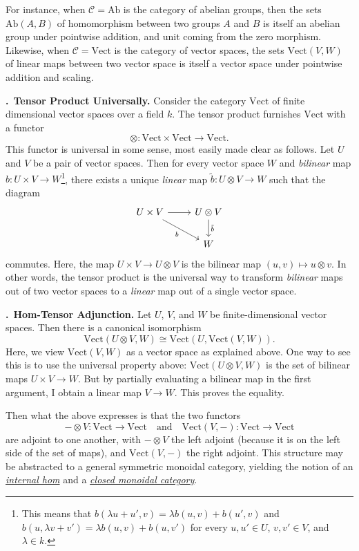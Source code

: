 \documentclass[11pt, noamsfonts]{amsart}
\newcommand{\pointheader}{\vspace{2mm}\noindent\refstepcounter{section}\textbf{\thesection.}}
\newcommand{\bpoint}[1]{\pointheader~{\bf #1.}}
\begin{document}
For instance, when \(\mathcal{C} = \mathrm{Ab}\) is the category of abelian
groups, then the sets \(\mathrm{Ab}(A,B)\) of homomorphism between two groups
\(A\) and \(B\) is itself an abelian group under pointwise addition, and
unit coming from the zero morphism. Likewise, when \(\mathcal{C} = \mathrm{Vect}\)
is the category of vector spaces, the sets \(\mathrm{Vect}(V,W)\) of linear maps
between two vector space is itself a vector space under pointwise addition and
scaling.

\bpoint{Tensor Product Universally}
Consider the category \(\mathrm{Vect}\) of finite dimensional vector spaces
over a field \(k\). The tensor product furnishes \(\mathrm{Vect}\) with a
functor
\[ \otimes \colon \mathrm{Vect} \times \mathrm{Vect} \to \mathrm{Vect}. \]
This functor is universal in some sense, most easily made clear as follows.
Let \(U\) and \(V\) be a pair of vector spaces. Then for every vector space
\(W\) and \emph{bilinear} map \(b \colon U \times V \to W\)\footnote{This means that
\(b(\lambda u + u', v) = \lambda b(u,v) + b(u',v)\) and \(b(u,\lambda v + v') = \lambda b(u,v) + b(u,v')\)
for every \(u,u' \in U\), \(v,v' \in V\), and \(\lambda \in k\).}, there exists
a unique \emph{linear} map \(\tilde b \colon U \otimes V \to W\) such that the diagram
\[
\begin{tikzcd}
U \times V \rar \ar[dr,"b"'] & U \otimes V \dar["\tilde b"] \\ & W
\end{tikzcd}
\]
commutes. Here, the map \(U \times V \to U \otimes V\) is the bilinear map
\((u,v) \mapsto u \otimes v\). In other words, the tensor product is the
universal way to transform \emph{bilinear} maps out of two vector spaces to a
\emph{linear} map out of a single vector space.

\bpoint{Hom-Tensor Adjunction}
Let \(U\), \(V\), and \(W\) be finite-dimensional vector spaces. Then there is
a canonical isomorphism
\[ \mathrm{Vect}(U \otimes V, W) \cong \mathrm{Vect}(U, \mathrm{Vect}(V,W)). \]
Here, we view \(\mathrm{Vect}(V,W)\) as a vector space as explained above.
One way to see this is to use the universal property above: \(\mathrm{Vect}(U \otimes V,W)\)
is the set of bilinear maps \(U \times V \to W\). But by partially evaluating a
bilinear map in the first argument, I obtain a linear map \(V \to W\). This
proves the equality.

Then what the above expresses is that the two functors
\[
- \otimes V \colon \mathrm{Vect} \to \mathrm{Vect}
\quad\text{and}\quad
\mathrm{Vect}(V,-) \colon \mathrm{Vect} \to \mathrm{Vect}
\]
are adjoint to one another, with \(-\otimes V\) the left adjoint (because it
is on the left side of the set of maps), and \(\mathrm{Vect}(V,-)\) the right
adjoint. This structure may be abstracted to a general symmetric monoidal category,
yielding the notion of an \href{https://ncatlab.org/nlab/show/internal+hom}{\emph{internal hom}}
and a \href{https://ncatlab.org/nlab/show/closed+monoidal+category}{\emph{closed monoidal category}}.
\end{document}
